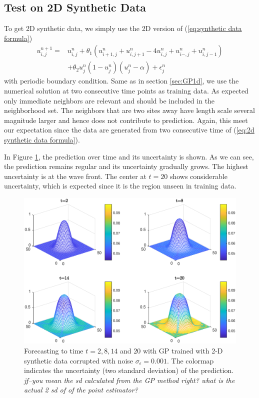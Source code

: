 \documentclass[smallextended,natbib]{svjour3}       %
\begin{document}
\subsection{Test on 2D Synthetic Data}
To get 2D synthetic data, we simply use the 2D version of (\ref{eq:synthetic data formula})
\begin{equation} \label{eq:2d synthetic data formula}
\begin{split}
u_{i,j}^{n+1}  = & u_{i,j}^{n}+\theta_{1}(u_{i+1,j}^{n}+u_{i,j+1}^{n}-4u_{i,j}^{n}+u_{i-,j}^{n}+u_{i,j-1}^{n}) \\
 &+\theta_{2}u_{j}^{n}(1-u_{j}^{n})(u_{j}^{n}-\alpha)+\epsilon_{j}^{n}
\end{split}
\end{equation}
with periodic boundary condition. Same as in section \ref{sec:GP1d}, we use the numerical solution at two consecutive time points as training data.   As expected only immediate neighbors are relevant and should be included in the neighborhood set. The neighbors that are two sites away have length scale several magnitude larger and hence does not contribute to prediction. Again, this meet our expectation since the data are generated from two consecutive time of (\ref{eq:2d synthetic data formula}).     


In Figure \ref{fig:u subplot 2d}, the prediction over time and its uncertainty is shown. As we can see, the prediction remains regular and its uncertainty gradually grows. The highest uncertainty is at the wave front. The center at $t=20$ shows considerable uncertainty, which is expected since it is the region unseen in training data.    

\begin{figure}[h]
\centerline{\includegraphics[width=\textwidth]{chapterGP/figures/2d_u_surf_S_color}}
\caption[Forecasting to Time $t=2,8,14$ and $20$ with GP Trained with 2-D Synthetic Data]{\label{fig:u subplot 2d} Forecasting to time $t=2,8,14$ and $20$ with GP trained with 2-D synthetic data corrupted with noise $\sigma_{\epsilon}=0.001$. The colormap indicates the uncertainty (two standard deviation) of the prediction. \emph{jf--you mean the sd calculated from the GP method right?  what is the actual 2 sd of of the point estimator?}}
\end{figure}
\end{document}
